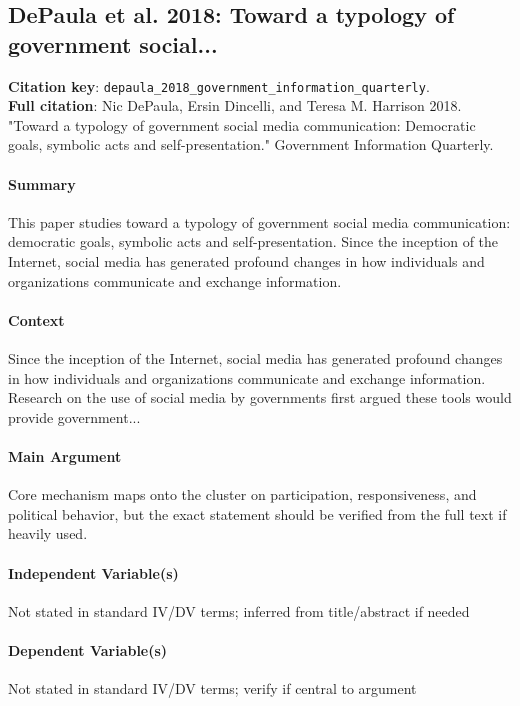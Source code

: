 \documentclass[12pt]{article}
\begin{document}
\subsection{DePaula et al. 2018: Toward a typology of government social...}
\textbf{Citation key}: \texttt{depaula\_2018\_government\_information\_quarterly}.\\
\textbf{Full citation}: Nic DePaula, Ersin Dincelli, and Teresa M. Harrison 2018. "Toward a typology of government social media communication: Democratic goals, symbolic acts and self-presentation." Government Information Quarterly.

\paragraph{Summary} This paper studies toward a typology of government social media communication: democratic goals, symbolic acts and self-presentation. Since the inception of the Internet, social media has generated profound changes in how individuals and organizations communicate and exchange information.

\paragraph{Context} Since the inception of the Internet, social media has generated profound changes in how individuals and organizations communicate and exchange information. Research on the use of social media by governments first argued these tools would provide government...

\paragraph{Main Argument} Core mechanism maps onto the cluster on participation, responsiveness, and political behavior, but the exact statement should be verified from the full text if heavily used.

\paragraph{Independent Variable(s)} Not stated in standard IV/DV terms; inferred from title/abstract if needed

\paragraph{Dependent Variable(s)} Not stated in standard IV/DV terms; verify if central to argument
\end{document}
